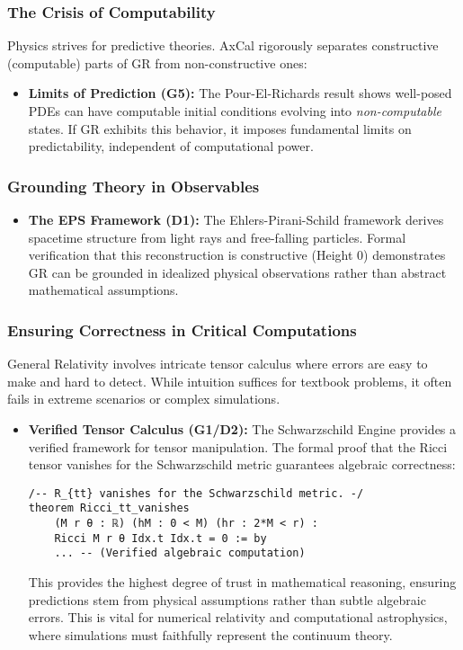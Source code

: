 \documentclass[11pt]{article}
\theoremstyle{definition}
\theoremstyle{remark}
\begin{document}
\subsubsection{The Crisis of Computability}

Physics strives for predictive theories. AxCal rigorously separates constructive (computable) parts of GR from non-constructive ones:

\begin{itemize}
\item \textbf{Limits of Prediction (G5):} The Pour-El-Richards result shows well-posed PDEs can have computable initial conditions evolving into \emph{non-computable} states. If GR exhibits this behavior, it imposes fundamental limits on predictability, independent of computational power.
\end{itemize}

\subsubsection{Grounding Theory in Observables}

\begin{itemize}
\item \textbf{The EPS Framework (D1):} The Ehlers-Pirani-Schild framework derives spacetime structure from light rays and free-falling particles. Formal verification that this reconstruction is constructive (Height 0) demonstrates GR can be grounded in idealized physical observations rather than abstract mathematical assumptions.
\end{itemize}

\subsubsection{Ensuring Correctness in Critical Computations}

General Relativity involves intricate tensor calculus where errors are easy to make and hard to detect. While intuition suffices for textbook problems, it often fails in extreme scenarios or complex simulations.

\begin{itemize}
\item \textbf{Verified Tensor Calculus (G1/D2):} The Schwarzschild Engine provides a verified framework for tensor manipulation. The formal proof that the Ricci tensor vanishes for the Schwarzschild metric guarantees algebraic correctness:

\begin{verbatim}
/-- R_{tt} vanishes for the Schwarzschild metric. -/
theorem Ricci_tt_vanishes
    (M r θ : ℝ) (hM : 0 < M) (hr : 2*M < r) :
    Ricci M r θ Idx.t Idx.t = 0 := by
    ... -- (Verified algebraic computation)
\end{verbatim}

This provides the highest degree of trust in mathematical reasoning, ensuring predictions stem from physical assumptions rather than subtle algebraic errors. This is vital for numerical relativity and computational astrophysics, where simulations must faithfully represent the continuum theory.
\end{itemize}
\end{document}
